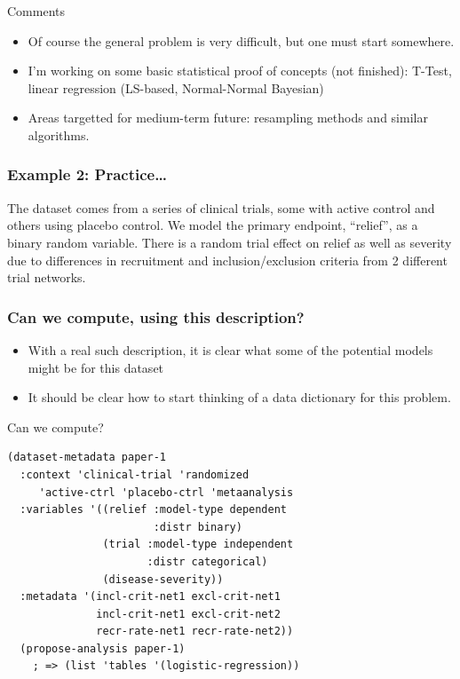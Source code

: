 \documentclass{beamer}
\begin{document}
\begin{frame}{Comments}
  \begin{itemize}
  \item Of course the general problem is very difficult, but one must
    start somewhere.
  \item I'm working on some basic statistical proof of concepts (not
    finished): T-Test, linear regression (LS-based, Normal-Normal Bayesian)
  \item Areas targetted for medium-term future: resampling methods and
    similar algorithms.
  \end{itemize}
\end{frame}

\begin{frame}
  \frametitle{Example 2: Practice\ldots} 
  \label{example2}
  The dataset comes from a series of clinical trials, some with active
  control and others using placebo control.  We model the primary
  endpoint, ``relief'', as a binary random variable.  There is a
  random trial effect on relief as well as severity due to differences
  in recruitment and inclusion/exclusion criteria from 2 different
  trial networks.
\end{frame}

\begin{frame}
  \frametitle{Can we compute, using this description?}
  \begin{itemize}
  \item With a real such description, it is clear what some of the
    potential models might be for this dataset
  \item It should be clear how to start thinking of a data dictionary
    for this problem.
  \end{itemize}
\end{frame}

\begin{frame}[fragile]{Can we compute?}
\begin{verbatim}
(dataset-metadata paper-1
  :context 'clinical-trial 'randomized 
     'active-ctrl 'placebo-ctrl 'metaanalysis
  :variables '((relief :model-type dependent
                       :distr binary)
               (trial :model-type independent
                      :distr categorical)
               (disease-severity))
  :metadata '(incl-crit-net1 excl-crit-net1
              incl-crit-net1 excl-crit-net2
              recr-rate-net1 recr-rate-net2))
  (propose-analysis paper-1)
    ; => (list 'tables '(logistic-regression))
\end{verbatim}
\end{frame}
\end{document}
